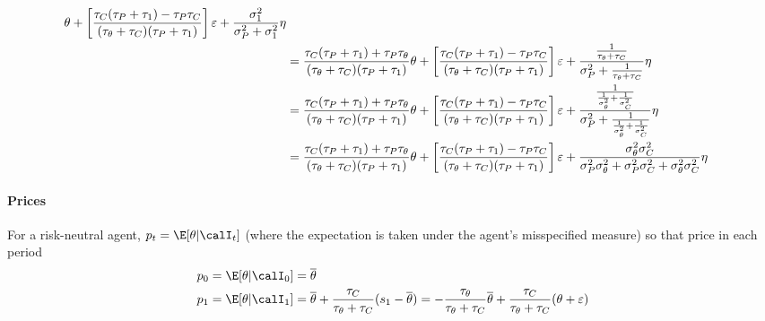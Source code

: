 \documentclass[12pt]{article}
\theoremstyle{plain}
\theoremstyle{definition}
\theoremstyle{remark}
\begin{document}
\begin{itemize}
\begin{align*}
      \theta
      +
      \left[
      \frac{\tau_C(\tau_P+\tau_1)-\tau_P\tau_C}{(\tau_\theta+\tau_C)(\tau_P+\tau_1)}
      \right]
      \varepsilon
      +
      \frac{\sigma_1^2}{\sigma_P^2+\sigma_1^2}
      \eta
      \\
      &=
      \frac{\tau_C(\tau_P+\tau_1)+\tau_P\tau_\theta}{(\tau_\theta+\tau_C)(\tau_P+\tau_1)}
      \theta
      +
      \left[
      \frac{\tau_C(\tau_P+\tau_1)-\tau_P\tau_C}{(\tau_\theta+\tau_C)(\tau_P+\tau_1)}
      \right]
      \varepsilon
      +
      \frac{\frac{1}{\tau_\theta+\tau_C}}{\sigma_P^2+\frac{1}{\tau_\theta+\tau_C}}
      \eta
      \\
      &=
      \frac{\tau_C(\tau_P+\tau_1)+\tau_P\tau_\theta}{(\tau_\theta+\tau_C)(\tau_P+\tau_1)}
      \theta
      +
      \left[
      \frac{\tau_C(\tau_P+\tau_1)-\tau_P\tau_C}{(\tau_\theta+\tau_C)(\tau_P+\tau_1)}
      \right]
      \varepsilon
      +
      \frac{%
        \frac{1}{\frac{1}{\sigma_\theta^2}+\frac{1}{\sigma_C^2}}
      }{%
        \sigma_P^2
        + \frac{1}{\frac{1}{\sigma_\theta^2}+\frac{1}{\sigma_C^2}}
      }
      \eta
      \\
      &=
      \frac{\tau_C(\tau_P+\tau_1)+\tau_P\tau_\theta}{(\tau_\theta+\tau_C)(\tau_P+\tau_1)}
      \theta
      +
      \left[
      \frac{\tau_C(\tau_P+\tau_1)-\tau_P\tau_C}{(\tau_\theta+\tau_C)(\tau_P+\tau_1)}
      \right]
      \varepsilon
      +
      \frac{%
        \sigma^2_\theta\sigma_C^2
      }{%
        \sigma_P^2\sigma_\theta^2
        +\sigma_P^2\sigma_C^2
        + \sigma^2_\theta\sigma_C^2
      }
      \eta
    \end{align*}


\end{itemize}
\paragraph{Prices}
For a risk-neutral agent, $p_t=\E[\theta|\calI_t]$
(where the expectation is taken under the agent's misspecified measure)
so that price in each period
\begin{align*}
  p_0
  &=
  \E[\theta|\calI_0]
  =
  \overline{\theta} \\
  p_1
  &=
  \E[\theta|\calI_1]
  =
  \overline{\theta}
  + \frac{\tau_C}{\tau_\theta+\tau_C}
  (s_1-\overline{\theta})
  =
  -\frac{\tau_\theta}{\tau_\theta+\tau_C}
  \overline{\theta}
  +
  \frac{\tau_C}{\tau_\theta+\tau_C}
  (\theta+\varepsilon)
  \\
\end{align*}
\end{document}
